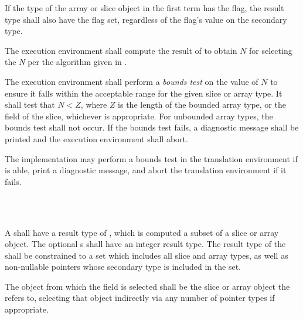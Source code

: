 \specsubsubitem
If the type of the array or slice object in the first term has the
 flag, the result type shall also have the 
flag set, regardless of the flag's value on the secondary type.

\specsubsubitem
The execution environment shall compute the result of
 to obtain $N$ for selecting the \textit{N} per the
algorithm given in .

\specsubsubitem
The execution environment shall perform a \textit{bounds test} on the value of
$N$ to ensure it falls within the acceptable range for the given slice or array
type. It shall test that $N < Z$, where $Z$ is the length of the bounded array
type, or the  field of the slice, whichever is appropriate.  For
unbounded array types, the bounds test shall not occur. If the bounds test
fails, a diagnostic message shall be printed and the execution environment
shall abort.

The implementation may perform a bounds test in the translation environment if
is able, print a diagnostic message, and abort the translation environment if
it fails.


\begin{grammar}
 \\
	 \terminal{[}    \terminal{]} \\
\end{grammar}

\specsubsubitem
A  shall have a result type of
, which is computed a subset of a slice or array object.
The optional s shall have an integer result type. The
result type of the  shall be constrained to
a set which includes all slice and array types, as well as non-nullable pointers
whose secondary type is included in the set.


\specsubsubitem
The object from which the field is selected shall be the slice or array object
the  refers to, selecting that object indirectly
via any number of pointer types if appropriate.

